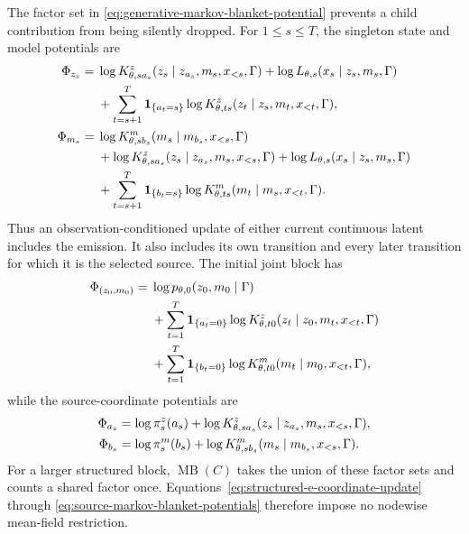 The factor set in \cref{eq:generative-markov-blanket-potential} prevents a child contribution from being silently dropped. For $1\leq s\leq T$, the singleton state and model potentials are
\begin{equation}
\begin{aligned}
\Phi_{z_s}
={}&\log K^z_{\theta,sa_s}
(z_s\mid z_{a_s},m_s,x_{<s},\Gamma)
+\log L_{\theta,s}(x_s\mid z_s,m_s,\Gamma)\\
&+\sum_{t=s+1}^{T}\mathbf 1_{\{a_t=s\}}
\log K^z_{\theta,ts}
(z_t\mid z_s,m_t,x_{<t},\Gamma),\\
\Phi_{m_s}
={}&\log K^m_{\theta,sb_s}
(m_s\mid m_{b_s},x_{<s},\Gamma)\\
&+\log K^z_{\theta,sa_s}
(z_s\mid z_{a_s},m_s,x_{<s},\Gamma)
+\log L_{\theta,s}(x_s\mid z_s,m_s,\Gamma)\\
&+\sum_{t=s+1}^{T}\mathbf 1_{\{b_t=s\}}
\log K^m_{\theta,ts}
(m_t\mid m_s,x_{<t},\Gamma).
\end{aligned}
\label{eq:state-model-markov-blanket-potentials}
\end{equation}
Thus an observation-conditioned update of either current continuous latent includes the emission. It also includes its own transition and every later transition for which it is the selected source. The initial joint block has
\begin{equation}
\begin{aligned}
\Phi_{(z_0,m_0)}
={}&\log p_{\theta,0}(z_0,m_0\mid\Gamma)\\
&+\sum_{t=1}^{T}\mathbf 1_{\{a_t=0\}}
\log K^z_{\theta,t0}(z_t\mid z_0,m_t,x_{<t},\Gamma)\\
&+\sum_{t=1}^{T}\mathbf 1_{\{b_t=0\}}
\log K^m_{\theta,t0}(m_t\mid m_0,x_{<t},\Gamma),
\end{aligned}
\label{eq:initial-block-markov-blanket-potential}
\end{equation}
while the source-coordinate potentials are
\begin{equation}
\begin{aligned}
\Phi_{a_s}
&=\log\pi_s^z(a_s)
+\log K^z_{\theta,sa_s}
(z_s\mid z_{a_s},m_s,x_{<s},\Gamma),\\
\Phi_{b_s}
&=\log\pi_s^m(b_s)
+\log K^m_{\theta,sb_s}
(m_s\mid m_{b_s},x_{<s},\Gamma).
\end{aligned}
\label{eq:source-markov-blanket-potentials}
\end{equation}
For a larger structured block, $\operatorname{MB}(C)$ takes the union of these factor sets and counts a shared factor once. Equations~\eqref{eq:structured-e-coordinate-update} through \eqref{eq:source-markov-blanket-potentials} therefore impose no nodewise mean-field restriction.

